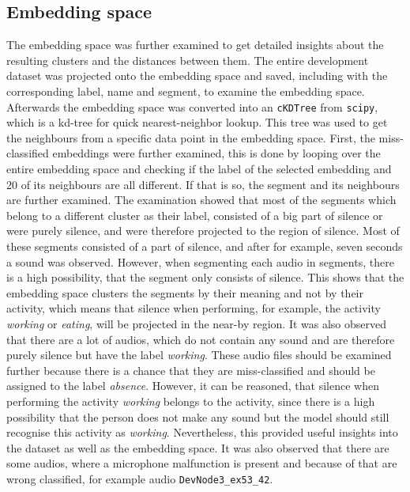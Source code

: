 \subsection{Embedding space}
\label{sub:Eval-Embedding-Space-DCASE}
The embedding space was further examined to get detailed insights about the resulting clusters and the distances between them.  The entire development dataset was projected onto the embedding space and saved, including with the corresponding label, name and segment, to examine the embedding space. Afterwards the embedding space was converted into an \texttt{cKDTree} from \texttt{scipy}, which is a kd-tree for quick nearest-neighbor lookup. This tree was used to get the neighbours from a specific data point in the embedding space.
\newline
\newline
First, the miss-classified embeddings were further examined, this is done by looping over the entire embedding space and checking if the label of the selected embedding and 20 of its neighbours are all different. If that is so, the segment and its neighbours are further examined. The examination showed that most of the segments which belong to a different cluster as their label, consisted of a big part of silence or were purely silence, and were therefore projected to the region of silence. Most of these segments consisted of a part of silence, and after for example, seven seconds a sound was observed. However, when segmenting each audio in segments, there is a high possibility, that the segment only consists of silence. This shows that the embedding space clusters the segments by their meaning and not by their activity, which means that silence when performing, for example, the activity \textit{working} or \textit{eating}, will be projected in the near-by region. It was also observed that there are a lot of audios, which do not contain any sound and are therefore purely silence but have the label \textit{working}. These audio files should be examined further because there is a chance that they are miss-classified and should be assigned to the label \textit{absence}. However, it can be reasoned, that silence when performing the activity \textit{working} belongs to the activity, since there is a high possibility that the person does not make any sound but the model should still recognise this activity as \textit{working}. Nevertheless, this provided useful insights into the dataset as well as the embedding space. It was also observed that there are some audios, where a microphone malfunction is present and because of that are wrong classified, for example audio \texttt{DevNode3\_ex53\_42}.

